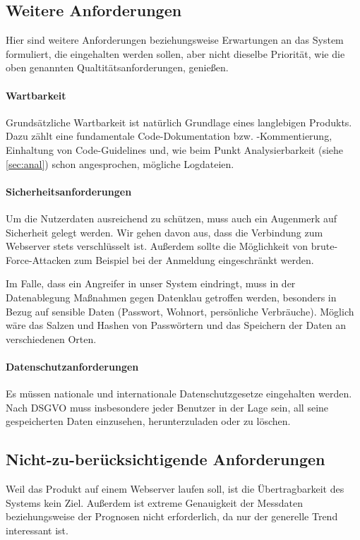 \subsection{Weitere Anforderungen} \label{sec:other}
Hier sind weitere Anforderungen beziehungsweise Erwartungen an das System formuliert,
die eingehalten werden sollen, aber nicht dieselbe Priorität, wie die oben genannten Qualtitätsanforderungen, genießen.
\paragraph{Wartbarkeit}

Grundsätzliche Wartbarkeit ist natürlich Grundlage eines langlebigen Produkts.
Dazu zählt eine fundamentale Code-Dokumentation bzw. -Kommentierung, Einhaltung von Code-Guidelines und,
wie beim Punkt Analysierbarkeit (siehe \ref{sec:anal}) schon angesprochen, mögliche Logdateien.


\paragraph{Sicherheitsanforderungen}
Um die Nutzerdaten ausreichend zu schützen, muss auch ein Augenmerk auf Sicherheit gelegt werden.
Wir gehen davon aus, dass die Verbindung zum Webserver stets verschlüsselt ist.
Außerdem sollte die Möglichkeit von brute-Force-Attacken zum Beispiel bei der Anmeldung eingeschränkt werden.

Im Falle, dass ein Angreifer in unser System eindringt, muss in der Datenablegung Maßnahmen gegen Datenklau
getroffen werden, besonders in Bezug auf sensible Daten (Passwort, Wohnort, persönliche Verbräuche).
Möglich wäre das Salzen und Hashen von Passwörtern und das Speichern der Daten an verschiedenen Orten.

\paragraph{Datenschutzanforderungen}
Es müssen nationale und internationale Datenschutzgesetze eingehalten werden.
Nach DSGVO muss insbesondere jeder Benutzer in der Lage sein, all seine gespeicherten Daten einzusehen,
herunterzuladen oder zu löschen.

\subsection{Nicht-zu-berücksichtigende Anforderungen}
Weil das Produkt auf einem Webserver laufen soll, ist die Übertragbarkeit des Systems kein Ziel.
Außerdem ist extreme Genauigkeit der Messdaten beziehungsweise der Prognosen nicht erforderlich,
da nur der generelle Trend interessant ist.